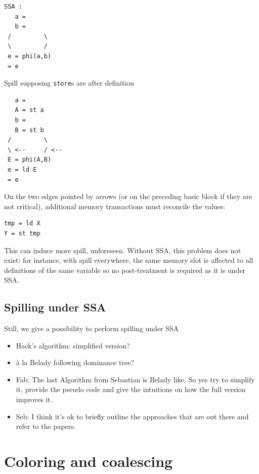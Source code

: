 {\begin{minipage}{.45\textwidth}
\begin{verbatim}
SSA :
   a =
   b =
 /         \
 \         /
 e = phi(a,b)
 = e
\end{verbatim}
\end{minipage}
\begin{minipage}{.45\textwidth}
Spill supposing {\tt store}s are after definition
\begin{verbatim}
   a =
   A = st a
   b =
   B = st b
 /         \
 \ <--     / <--
 E = phi(A,B)
 e = ld E
 = e
\end{verbatim}
\end{minipage}

On the two edges pointed by arrows (or on the preceding basic block if they are 
not critical), additional memory transactions must reconcile the values:
\begin{verbatim}
tmp = ld X
Y = st tmp
\end{verbatim}

This can induce more spill, unforeseen.
Without SSA, this problem does not exist: for instance, with spill everywhere, 
the same memory slot is affected to all definitions of the same variable so no 
post-treatment is required as it is under SSA.



\subsection{Spilling under SSA}
Still, we give a possibility to perform spilling under SSA
\begin{itemize}
  \item Hack's algorithm: simplified version?
  \item \`a la Belady following dominance tree?

  \item Fab: The last Algorithm from Sebastian is Belady like. So yes try to simplify it, provide the pseudo code and give the intuitions on how the full version improves it.
  \item Seb: I think it's ok to briefly outline the approaches that are out there and refer to the papers.

\end{itemize}


\cite{Braun09:spilling-ssa}


\section{Coloring and coalescing}

}
